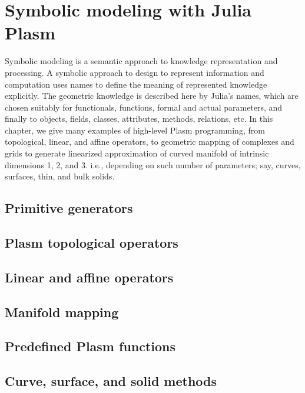 
\chapter{Symbolic modeling with Julia Plasm}
\label{chapt:5}

Symbolic modeling is a semantic approach to knowledge representation and processing. A  symbolic approach to design to represent information and computation uses names to define the meaning of represented knowledge explicitly. The geometric knowledge is described here by Julia's names, which are chosen suitably for functionals, functions, formal and actual parameters, and finally to objects, fields, classes, attributes, methods, relations, etc. In this chapter, we give many examples of high-level Plasm programming, from topological, linear, and affine operators, to geometric mapping of complexes and grids to generate linearized approximation of curved manifold of intrinsic dimensions 1, 2, and 3. i.e., depending on such number of parameters; say, curves, surfaces, thin, and bulk solids.

\section{ Primitive generators}\label{sect:5-1}


\section{ Plasm topological operators}\label{sect:5-2}


\section{ Linear and affine operators}\label{sect:5-3}


\section{ Manifold mapping}\label{sect:5-4}


\section{ Predefined Plasm functions}\label{sect:5-5}


\section{ Curve, surface, and solid methods}\label{sect:5-6}


